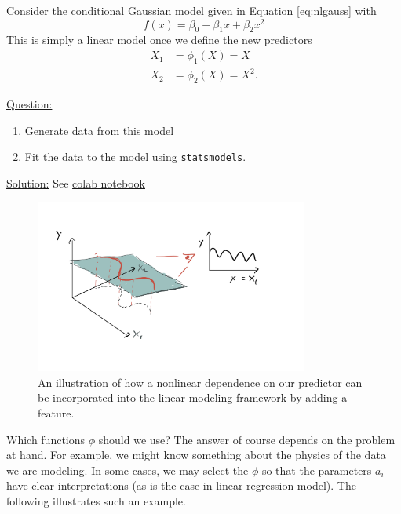 \begin{example}

Consider the conditional Gaussian model given in Equation \ref{eq:nlgauss} with 
\begin{equation*}
f(x) = \beta_0+\beta_1x + \beta_2x^2
\end{equation*}
 This is simply a linear model once we define the new predictors 
\begin{align*}
X_1 &= \phi_1(X) = X\\
X_2 &= \phi_2(X) = X^2. 
\end{align*}


\noindent
\underline{Question:}
\begin{enumerate}[label=(\alph*)]
\item Generate data from this model
\item Fit the data to the model using \verb!statsmodels!.\\
\end{enumerate}

\noindent
\underline{Solution:}
See \href{https://colab.research.google.com/drive/1q3mfX4od6iLFHy2dYFaKzw6FjaTbAaD3?usp=sharing}{colab notebook}

\end{example}



\begin{figure}[h]
    \centering
    \includegraphics[width=0.8\textwidth]{./../figures/feature}
    \caption{An illustration of how a nonlinear dependence on our predictor can be incorporated into the linear modeling framework by adding a feature.}
    \label{fig:feature}
\end{figure}

Which functions $\phi$ should we use? The answer of course depends on the problem at hand. For example, we might know something about the physics of the data we are modeling. In some cases, we may select the $\phi$ so that the parameters $a_i$ have clear interpretations (as is the case in linear regression model). The following illustrates such an example.  

